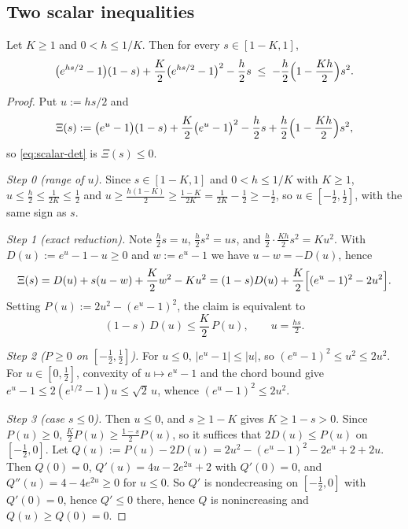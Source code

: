 \subsection{Two scalar inequalities}

\begin{lemma}
\label{lem:scalar-det}
Let $K\geq1$ and $0<h\leq1/K$. Then for every $s\in[1-K,1]$,
\begin{equation}
\label{eq:scalar-det}
    \bigl(e^{hs/2}-1\bigr)(1-s)+\frac K2\bigl(e^{hs/2}-1\bigr)^2-\frac h2s
    \;\leq\;
    -\frac h2\Bigl(1-\frac{Kh}2\Bigr)s^2 .
\end{equation}
\end{lemma}

\begin{proof}
Put $u:=hs/2$ and
\[
    \Xi(s):=\bigl(e^u-1\bigr)(1-s)+\frac K2\bigl(e^u-1\bigr)^2-\frac h2s+\frac h2\Bigl(1-\frac{Kh}2\Bigr)s^2 ,
\]
so \eqref{eq:scalar-det} is $\Xi(s)\leq0$.

\emph{Step 0 (range of $u$).} Since $s\in[1-K,1]$ and $0<h\leq1/K$ with $K\geq1$,
$u\leq\tfrac h2\leq\tfrac1{2K}\leq\tfrac12$ and
$u\geq\tfrac{h(1-K)}2\geq\tfrac{1-K}{2K}=\tfrac1{2K}-\tfrac12\geq-\tfrac12$, so
$u\in[-\tfrac12,\tfrac12]$, with the same sign as $s$.

\emph{Step 1 (exact reduction).} Note $\tfrac h2s=u$, $\tfrac h2s^2=us$, and
$\tfrac h2\cdot\tfrac{Kh}2s^2=Ku^2$. With $D(u):=e^u-1-u\geq0$ and $w:=e^u-1$ we have
$u-w=-D(u)$, hence
\[
    \Xi(s)=D(u)+s(u-w)+\frac K2w^2-Ku^2
    =(1-s)D(u)+\frac K2\Bigl[(e^u-1)^2-2u^2\Bigr].
\]
Setting $P(u):=2u^2-(e^u-1)^2$, the claim is equivalent to
\begin{equation}
\label{eq:scalar-reduced}
    (1-s)\,D(u)\leq\frac K2\,P(u),\qquad u=\tfrac{hs}2 .
\end{equation}

\emph{Step 2 ($P\geq0$ on $[-\tfrac12,\tfrac12]$).} For $u\leq0$, $|e^u-1|\leq|u|$, so
$(e^u-1)^2\leq u^2\leq2u^2$. For $u\in[0,\tfrac12]$, convexity of $u\mapsto e^u-1$ and the chord
bound give $e^u-1\leq2(e^{1/2}-1)u\leq\sqrt2\,u$, whence $(e^u-1)^2\leq2u^2$.

\emph{Step 3 (case $s\leq0$).} Then $u\leq0$, and $s\geq1-K$ gives $K\geq1-s>0$. Since $P(u)\geq0$,
$\tfrac K2P(u)\geq\tfrac{1-s}2P(u)$, so it suffices that $2D(u)\leq P(u)$ on $[-\tfrac12,0]$.
Let $Q(u):=P(u)-2D(u)=2u^2-(e^u-1)^2-2e^u+2+2u$. Then $Q(0)=0$,
$Q'(u)=4u-2e^{2u}+2$ with $Q'(0)=0$, and $Q''(u)=4-4e^{2u}\geq0$ for $u\leq0$. So $Q'$ is
nondecreasing on $[-\tfrac12,0]$ with $Q'(0)=0$, hence $Q'\leq0$ there, hence $Q$ is
nonincreasing and $Q(u)\geq Q(0)=0$.


\end{proof}
